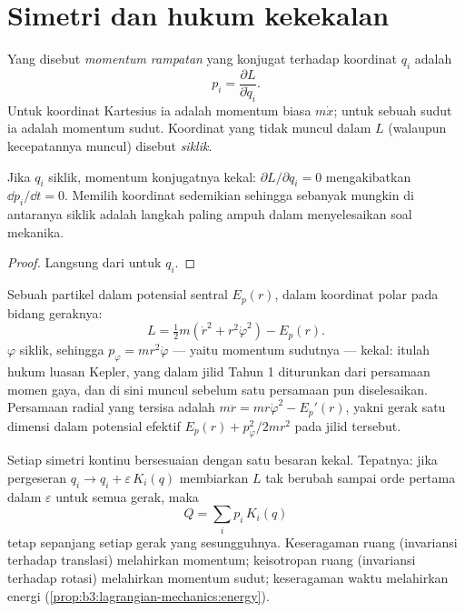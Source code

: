\section{Simetri dan hukum kekekalan}

\begin{definition}\label{def:b3:lagrangian-mechanics:momentum}
Yang disebut \emph{momentum rampatan} yang konjugat terhadap koordinat $q_i$ adalah
\[
p_i = \frac{\partial L}{\partial\dot q_i} .
\]
Untuk koordinat Kartesius ia adalah momentum biasa $m\dot x$; untuk
sebuah sudut ia adalah momentum sudut. Koordinat yang tidak muncul
dalam $L$ (walaupun kecepatannya muncul) disebut \emph{siklik}.
\end{definition}

\begin{proposition}\label{prop:b3:lagrangian-mechanics:cyclic}
Jika $q_i$ siklik, momentum konjugatnya kekal:
$\partial L/\partial q_i = 0$ mengakibatkan $\dd p_i/\dd t = 0$.
Memilih koordinat sedemikian sehingga sebanyak mungkin di antaranya
siklik adalah langkah paling ampuh dalam menyelesaikan soal mekanika.
\end{proposition}

\begin{proof}
Langsung dari  untuk $q_i$.
\end{proof}

\begin{example}\label{ex:b3:lagrangian-mechanics:central}
Sebuah partikel dalam potensial sentral $E_p(r)$, dalam koordinat polar
pada bidang geraknya:
\[
L = \tfrac12 m(\dot r^2 + r^2\dot\varphi^2) - E_p(r) .
\]
$\varphi$ siklik, sehingga $p_\varphi = mr^2\dot\varphi$ --- yaitu
momentum sudutnya --- kekal: itulah hukum luasan Kepler, yang dalam
jilid Tahun 1 diturunkan dari persamaan momen gaya, dan di sini muncul
sebelum satu persamaan pun diselesaikan. Persamaan radial yang tersisa
adalah $m\ddot r = mr\dot\varphi^2 - E_p'(r)$, yakni gerak satu dimensi
dalam potensial efektif $E_p(r) + p_\varphi^2/2mr^2$ pada jilid
tersebut.
\end{example}

\begin{theorem}\label{thm:b3:lagrangian-mechanics:noether}
Setiap simetri kontinu  bersesuaian dengan satu besaran kekal.
Tepatnya: jika pergeseran $q_i \to q_i + \varepsilon\,K_i(q)$ membiarkan
$L$ tak berubah sampai orde pertama dalam $\varepsilon$ untuk semua
gerak, maka
\[
Q = \sum_i p_i\,K_i(q)
\]
tetap sepanjang setiap gerak yang sesungguhnya. Keseragaman ruang
(invariansi terhadap translasi) melahirkan momentum; keisotropan ruang
(invariansi terhadap rotasi) melahirkan momentum sudut; keseragaman
waktu melahirkan energi
(\cref{prop:b3:lagrangian-mechanics:energy}).
\end{theorem}

